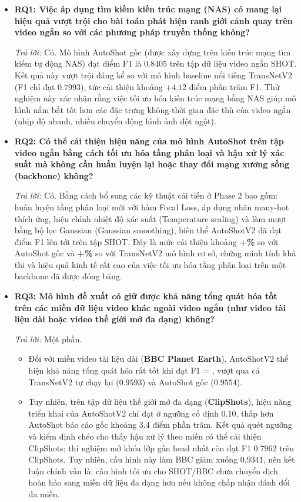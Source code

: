 \begin{itemize}
    \item \textbf{RQ1: Việc áp dụng tìm kiếm kiến trúc mạng (NAS) có mang lại hiệu quả vượt trội cho bài toán phát hiện ranh giới cảnh quay trên video ngắn so với các phương pháp truyền thống không?}
    
    \textit{Trả lời:} Có. Mô hình AutoShot gốc (được xây dựng trên kiến trúc mạng tìm kiếm tự động NAS) đạt điểm F1 là $0.8405$ trên tập dữ liệu video ngắn SHOT. Kết quả này vượt trội đáng kể so với mô hình baseline nổi tiếng TransNetV2 (F1 chỉ đạt $0.7993$), tức cải thiện khoảng $+4.12$ điểm phần trăm F1. Thử nghiệm này xác nhận rằng việc tối ưu hóa kiến trúc mạng bằng NAS giúp mô hình nắm bắt tốt hơn các đặc trưng không-thời gian đặc thù của video ngắn (nhịp độ nhanh, nhiều chuyển động hình ảnh đột ngột).

    \item \textbf{RQ2: Có thể cải thiện hiệu năng của mô hình AutoShot trên tập video ngắn bằng cách tối ưu hóa tầng phân loại và hậu xử lý xác suất mà không cần huấn luyện lại hoặc thay đổi mạng xương sống (backbone) không?}
    
    \textit{Trả lời:} Có. Bằng cách bổ sung các kỹ thuật cải tiến ở Phase 2 bao gồm: huấn luyện tầng phân loại mới với hàm Focal Loss, áp dụng nhãn many-hot thích ứng, hiệu chỉnh nhiệt độ xác suất (Temperature scaling) và làm mượt bằng bộ lọc Gaussian (Gaussian smoothing), biến thể AutoShotV2 đã đạt điểm F1 lên tới \textbf{\ASVTwoShotFOne{}} trên tập SHOT. Đây là mức cải thiện khoảng \textbf{+\ASVTwoVsAutoShotShotPP\%} so với AutoShot gốc và \textbf{+\ASVTwoVsTransNetShotPP\%} so với TransNetV2 mô hình cơ sở, chứng minh tính khả thi và hiệu quả kinh tế rất cao của việc tối ưu hóa tầng phân loại trên một backbone đã được đóng băng.

    \item \textbf{RQ3: Mô hình đề xuất có giữ được khả năng tổng quát hóa tốt trên các miền dữ liệu video khác ngoài video ngắn (như video tài liệu dài hoặc video thế giới mở đa dạng) không?}
    
    \textit{Trả lời:} Một phần. 
    \begin{itemize}
        \item Đối với miền video tài liệu dài (\textbf{BBC Planet Earth}), AutoShotV2 thể hiện khả năng tổng quát hóa rất tốt khi đạt F1 = \textbf{\ASVTwoBBCFOne{}}, vượt qua cả TransNetV2 tự chạy lại ($0.9593$) và AutoShot gốc ($0.9554$).
        \item Tuy nhiên, trên tập dữ liệu thế giới mở đa dạng (\textbf{ClipShots}), hiệu năng triển khai của AutoShotV2 chỉ đạt \textbf{\ASVTwoClipFOne{}} ở ngưỡng cố định $0.10$, thấp hơn AutoShot báo cáo gốc khoảng $3.4$ điểm phần trăm. Kết quả quét ngưỡng và kiểm định chéo cho thấy hậu xử lý theo miền có thể cải thiện ClipShots; thí nghiệm mở khóa lớp gần head nhất còn đạt F1 $0.7962$ trên ClipShots. Tuy nhiên, cấu hình này làm BBC giảm xuống $0.9341$, nên kết luận chính vẫn là: cấu hình tối ưu cho SHOT/BBC chưa chuyển dịch hoàn hảo sang miền dữ liệu đa dạng hơn nếu không chấp nhận đánh đổi đa miền.
    \end{itemize}
\end{itemize}

